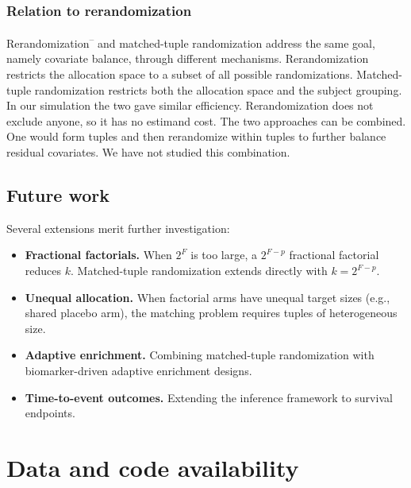 \documentclass[
  11pt,
]{article}
\providecommand{\tightlist}{%
  \setlength{\itemsep}{0pt}\setlength{\parskip}{0pt}}
\begin{document}
\subsubsection{Relation to rerandomization}\label{relation-to-rerandomization}

Rerandomization\textsuperscript{--} and matched-tuple
randomization address the same goal, namely covariate
balance, through different mechanisms. Rerandomization
restricts the allocation space to a subset of all possible
randomizations. Matched-tuple randomization restricts both
the allocation space and the subject grouping. In our
simulation the two gave similar efficiency. Rerandomization
does not exclude anyone, so it has no estimand cost. The
two approaches can be combined. One would form tuples and
then rerandomize within tuples to further balance residual
covariates. We have not studied this combination.

\subsection{Future work}\label{future-work}

Several extensions merit further investigation:

\begin{itemize}
\tightlist
\item
  \textbf{Fractional factorials.} When \(2^F\) is too large, a
  \(2^{F-p}\) fractional factorial reduces \(k\). Matched-tuple
  randomization extends directly with \(k = 2^{F-p}\).
\item
  \textbf{Unequal allocation.} When factorial arms have unequal
  target sizes (e.g., shared placebo arm), the matching
  problem requires tuples of heterogeneous size.
\item
  \textbf{Adaptive enrichment.} Combining matched-tuple
  randomization with biomarker-driven adaptive enrichment
  designs.
\item
  \textbf{Time-to-event outcomes.} Extending the inference
  framework to survival endpoints.
\end{itemize}

\section*{Data and code availability}\label{data-and-code-availability}
\end{document}
